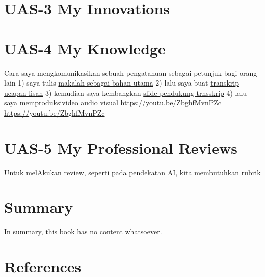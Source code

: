\documentclass[
  letterpaper,
  DIV=11,
  numbers=noendperiod]{scrreprt}
\begin{document}
\chapter{UAS-3 My Innovations}\label{uas-3-my-innovations}


\chapter{UAS-4 My Knowledge}\label{uas-4-my-knowledge}

Cara saya mengkomunikasikan sebuah pengatahuan sebagai petunjuk bagi
orang lain 1) saya tulis
\href{Rekomendasi\%20Presentasi\%20Efektif(Contoh\%20Makalah).pdf}{makalah
sebagai bahan utama} 2) lalu saya buat
\href{Contoh\%20Transkrip\%20Presentasi.pdf}{transkrip ucapan lisan} 3)
kemudian saya kembangkan
\href{Rekomendasi\%20Presentasi\%20(Contoh\%20Slides).pdf}{slide
pendukung trnsskrip} 4) lalu saya memproduksivideo audio visual
\url{https://youtu.be/ZbghfMvnPZc} \url{https://youtu.be/ZbghfMvnPZc}


\chapter{UAS-5 My Professional
Reviews}\label{uas-5-my-professional-reviews}

Untuk melAkukan review, seperti pada
\href{../My_Personal_Reviews/Doc.5.Mengevaluasi-Esai-Berdasarkan-Rubrik.pdf}{pendekatan
AI}, kita membutuhkan rubrik


\chapter{Summary}\label{summary}

In summary, this book has no content whatsoever.


\chapter*{References}\label{references}


\label{refs}
\end{document}

